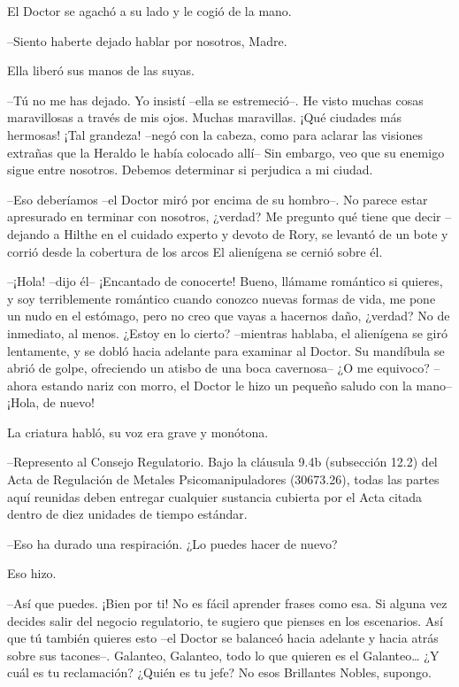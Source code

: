 {El Doctor se agachó a su lado y le cogió de la mano.}

{--Siento haberte dejado hablar por nosotros, Madre.}

{Ella liberó sus manos de las suyas.}

{--Tú no me has dejado. Yo insistí --ella se estremeció--. He visto
	muchas cosas maravillosas a través de mis ojos. Muchas maravillas. ¡Qué
	ciudades más hermosas! ¡Tal grandeza! --negó con la cabeza, como para
	aclarar las visiones extrañas que la Heraldo le había colocado allí--
	Sin embargo, veo que su enemigo sigue entre nosotros. Debemos determinar
si perjudica a mi ciudad.}

{--Eso deberíamos --el Doctor miró por encima de su hombro--. No
	parece estar apresurado en terminar con nosotros, ¿verdad? Me pregunto
	qué tiene que decir --dejando a Hilthe en el cuidado experto y devoto de
	Rory, se levantó de un bote y corrió desde la cobertura de los arcos El
alienígena se cernió sobre él.}

{--¡Hola! --dijo él-- ¡Encantado de conocerte! Bueno, llámame
	romántico si quieres, y soy terriblemente romántico cuando conozco
	nuevas formas de vida, me pone un nudo en el estómago, pero no creo que
	vayas a hacernos daño, ¿verdad? No de inmediato, al menos. ¿Estoy en lo
	cierto? --mientras hablaba, el alienígena se giró lentamente, y se dobló
	hacia adelante para examinar al Doctor. Su mandíbula se abrió de golpe,
	ofreciendo un atisbo de una boca cavernosa-- ¿O me equivoco? --ahora
	estando nariz con morro, el Doctor le hizo un pequeño saludo con la
mano-- ¡Hola, de nuevo!}

{La criatura habló, su voz era grave y monótona.}

{--Represento al Consejo Regulatorio. Bajo la cláusula 9.4b
	(subsección 12.2) del Acta de Regulación de Metales Psicomanipuladores
	(30673.26), todas las partes aquí reunidas deben entregar cualquier
	sustancia cubierta por el Acta citada dentro de diez unidades de tiempo
estándar.}

{--Eso ha durado una respiración. ¿Lo puedes hacer de nuevo?}

{Eso hizo.}

{--Así que puedes. ¡Bien por ti! No es fácil aprender frases como esa.
	Si alguna vez decides salir del negocio regulatorio, te sugiero que
	pienses en los escenarios. Así que tú también quieres esto --el Doctor
	se balanceó hacia adelante y hacia atrás sobre sus tacones--. Galanteo,
	Galanteo, todo lo que quieren es el Galanteo\ldots{} ¿Y cuál es tu
reclamación? ¿Quién es tu jefe? No esos Brillantes Nobles, supongo.}

